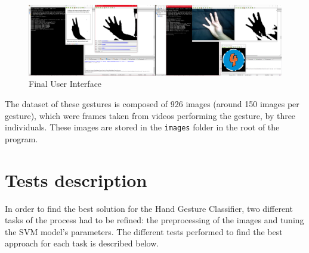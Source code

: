 \documentclass[a4paper,10pt,english]{article}
\begin{document}
        \begin{figure}[h!]
            \centering
            \includegraphics[width=530pt]{images/screenshots}
            \caption{Final User Interface} \label{fig:screenshots}
        \end{figure}

         
         The dataset of these gestures is composed of 926 images (around 150 images per gesture), which were frames taken from videos performing the gesture, by three individuals. These images are stored in the \texttt{images} folder in the root of the program.
         
         
    \section{Tests description}\label{sec:tests}
        
        In order to find the best solution for the Hand Gesture Classifier, two different tasks of the process had to be refined: the preprocessing of the images and tuning the SVM model's parameters. The different tests performed to find the best approach for each task is described below.
        
\end{document}
